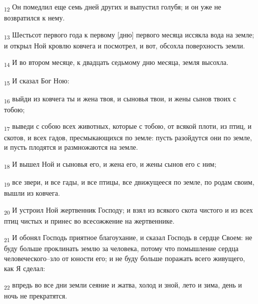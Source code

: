 \begin{tcolorbox}
\textsubscript{12} Он помедлил еще семь дней других и выпустил голубя; и он уже не возвратился к нему.
\end{tcolorbox}
\begin{tcolorbox}
\textsubscript{13} Шестьсот первого года к первому [дню] первого месяца иссякла вода на земле; и открыл Ной кровлю ковчега и посмотрел, и вот, обсохла поверхность земли.
\end{tcolorbox}
\begin{tcolorbox}
\textsubscript{14} И во втором месяце, к двадцать седьмому дню месяца, земля высохла.
\end{tcolorbox}
\begin{tcolorbox}
\textsubscript{15} И сказал Бог Ною:
\end{tcolorbox}
\begin{tcolorbox}
\textsubscript{16} выйди из ковчега ты и жена твоя, и сыновья твои, и жены сынов твоих с тобою;
\end{tcolorbox}
\begin{tcolorbox}
\textsubscript{17} выведи с собою всех животных, которые с тобою, от всякой плоти, из птиц, и скотов, и всех гадов, пресмыкающихся по земле: пусть разойдутся они по земле, и пусть плодятся и размножаются на земле.
\end{tcolorbox}
\begin{tcolorbox}
\textsubscript{18} И вышел Ной и сыновья его, и жена его, и жены сынов его с ним;
\end{tcolorbox}
\begin{tcolorbox}
\textsubscript{19} все звери, и все гады, и все птицы, все движущееся по земле, по родам своим, вышли из ковчега.
\end{tcolorbox}
\begin{tcolorbox}
\textsubscript{20} И устроил Ной жертвенник Господу; и взял из всякого скота чистого и из всех птиц чистых и принес во всесожжение на жертвеннике.
\end{tcolorbox}
\begin{tcolorbox}
\textsubscript{21} И обонял Господь приятное благоухание, и сказал Господь в сердце Своем: не буду больше проклинать землю за человека, потому что помышление сердца человеческого--зло от юности его; и не буду больше поражать всего живущего, как Я сделал:
\end{tcolorbox}
\begin{tcolorbox}
\textsubscript{22} впредь во все дни земли сеяние и жатва, холод и зной, лето и зима, день и ночь не прекратятся.
\end{tcolorbox}
